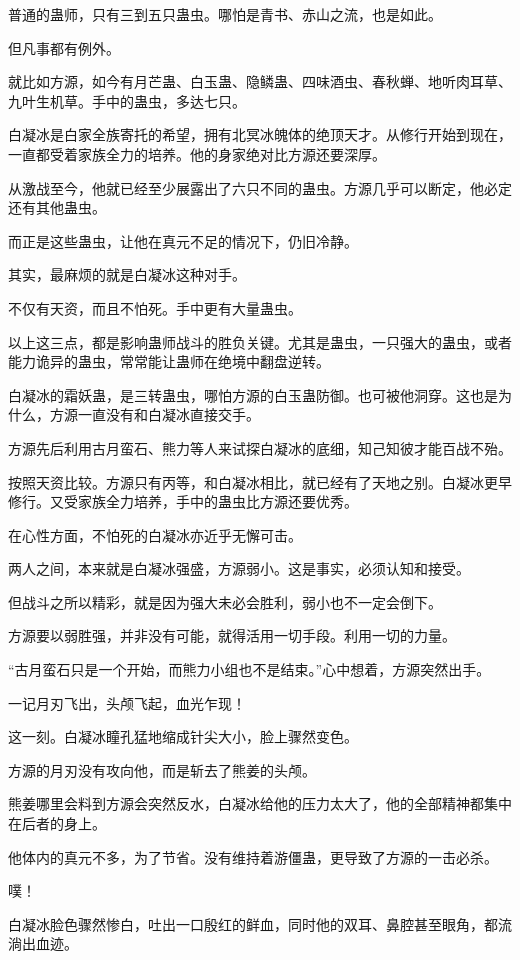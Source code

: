\begin{this_body}
普通的蛊师，只有三到五只蛊虫。哪怕是青书、赤山之流，也是如此。

但凡事都有例外。

就比如方源，如今有月芒蛊、白玉蛊、隐鳞蛊、四味酒虫、春秋蝉、地听肉耳草、九叶生机草。手中的蛊虫，多达七只。

白凝冰是白家全族寄托的希望，拥有北冥冰魄体的绝顶天才。从修行开始到现在，一直都受着家族全力的培养。他的身家绝对比方源还要深厚。

从激战至今，他就已经至少展露出了六只不同的蛊虫。方源几乎可以断定，他必定还有其他蛊虫。

而正是这些蛊虫，让他在真元不足的情况下，仍旧冷静。

其实，最麻烦的就是白凝冰这种对手。

不仅有天资，而且不怕死。手中更有大量蛊虫。

以上这三点，都是影响蛊师战斗的胜负关键。尤其是蛊虫，一只强大的蛊虫，或者能力诡异的蛊虫，常常能让蛊师在绝境中翻盘逆转。

白凝冰的霜妖蛊，是三转蛊虫，哪怕方源的白玉蛊防御。也可被他洞穿。这也是为什么，方源一直没有和白凝冰直接交手。

方源先后利用古月蛮石、熊力等人来试探白凝冰的底细，知己知彼才能百战不殆。

按照天资比较。方源只有丙等，和白凝冰相比，就已经有了天地之别。白凝冰更早修行。又受家族全力培养，手中的蛊虫比方源还要优秀。

在心性方面，不怕死的白凝冰亦近乎无懈可击。

两人之间，本来就是白凝冰强盛，方源弱小。这是事实，必须认知和接受。

但战斗之所以精彩，就是因为强大未必会胜利，弱小也不一定会倒下。

方源要以弱胜强，并非没有可能，就得活用一切手段。利用一切的力量。

“古月蛮石只是一个开始，而熊力小组也不是结束。”心中想着，方源突然出手。

一记月刃飞出，头颅飞起，血光乍现！

这一刻。白凝冰瞳孔猛地缩成针尖大小，脸上骤然变色。

方源的月刃没有攻向他，而是斩去了熊姜的头颅。

熊姜哪里会料到方源会突然反水，白凝冰给他的压力太大了，他的全部精神都集中在后者的身上。

他体内的真元不多，为了节省。没有维持着游僵蛊，更导致了方源的一击必杀。

噗！

白凝冰脸色骤然惨白，吐出一口殷红的鲜血，同时他的双耳、鼻腔甚至眼角，都流淌出血迹。


\end{this_body}

